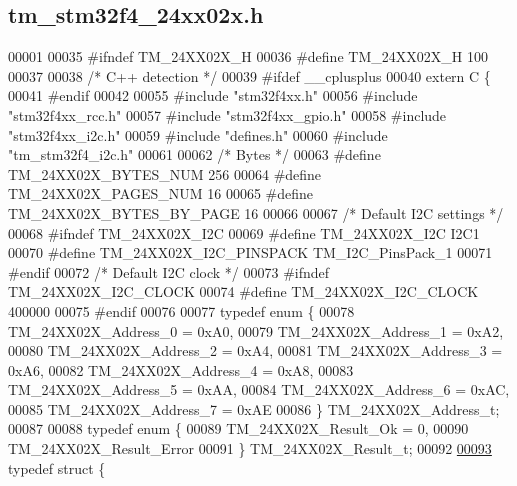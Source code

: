 \hypertarget{tm__stm32f4__24xx02x_8h_source}{}\subsection{tm\+\_\+stm32f4\+\_\+24xx02x.\+h}

\begin{DoxyCode}
00001 
00035 \textcolor{preprocessor}{#ifndef TM\_24XX02X\_H}
00036 \textcolor{preprocessor}{#define TM\_24XX02X\_H 100}
00037 
00038 \textcolor{comment}{/* C++ detection */}
00039 \textcolor{preprocessor}{#ifdef \_\_cplusplus}
00040 \textcolor{keyword}{extern} C \{
00041 \textcolor{preprocessor}{#endif}
00042 
00055 \textcolor{preprocessor}{#include "stm32f4xx.h"}
00056 \textcolor{preprocessor}{#include "stm32f4xx\_rcc.h"}
00057 \textcolor{preprocessor}{#include "stm32f4xx\_gpio.h"}
00058 \textcolor{preprocessor}{#include "stm32f4xx\_i2c.h"}
00059 \textcolor{preprocessor}{#include "defines.h"}
00060 \textcolor{preprocessor}{#include "tm\_stm32f4\_i2c.h"}
00061 
00062 \textcolor{comment}{/* Bytes */}
00063 \textcolor{preprocessor}{#define TM\_24XX02X\_BYTES\_NUM        256}
00064 \textcolor{preprocessor}{#define TM\_24XX02X\_PAGES\_NUM        16}
00065 \textcolor{preprocessor}{#define TM\_24XX02X\_BYTES\_BY\_PAGE    16}
00066 
00067 \textcolor{comment}{/* Default I2C settings */}
00068 \textcolor{preprocessor}{#ifndef TM\_24XX02X\_I2C}
00069 \textcolor{preprocessor}{#define TM\_24XX02X\_I2C              I2C1}
00070 \textcolor{preprocessor}{#define TM\_24XX02X\_I2C\_PINSPACK     TM\_I2C\_PinsPack\_1}
00071 \textcolor{preprocessor}{#endif}
00072 \textcolor{comment}{/* Default I2C clock */}
00073 \textcolor{preprocessor}{#ifndef TM\_24XX02X\_I2C\_CLOCK}
00074 \textcolor{preprocessor}{#define TM\_24XX02X\_I2C\_CLOCK        400000}
00075 \textcolor{preprocessor}{#endif}
00076 
00077 \textcolor{keyword}{typedef} \textcolor{keyword}{enum} \{
00078     TM\_24XX02X\_Address\_0 = 0xA0,
00079     TM\_24XX02X\_Address\_1 = 0xA2,
00080     TM\_24XX02X\_Address\_2 = 0xA4,
00081     TM\_24XX02X\_Address\_3 = 0xA6,
00082     TM\_24XX02X\_Address\_4 = 0xA8,
00083     TM\_24XX02X\_Address\_5 = 0xAA,
00084     TM\_24XX02X\_Address\_6 = 0xAC,
00085     TM\_24XX02X\_Address\_7 = 0xAE
00086 \} TM\_24XX02X\_Address\_t;
00087 
00088 \textcolor{keyword}{typedef} \textcolor{keyword}{enum} \{
00089     TM\_24XX02X\_Result\_Ok = 0,
00090     TM\_24XX02X\_Result\_Error
00091 \} TM\_24XX02X\_Result\_t;
00092 
\hypertarget{tm__stm32f4__24xx02x_8h_source_l00093}{}\hyperlink{struct_t_m__24_x_x02_x__t}{00093} \textcolor{keyword}{typedef} \textcolor{keyword}{struct }\{

\end{DoxyCode}
